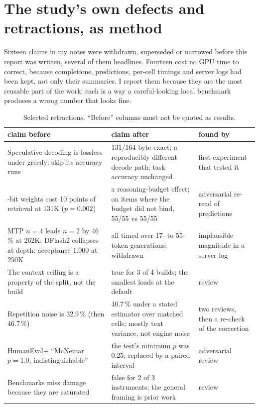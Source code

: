 \section{The study's own defects and retractions, as method}\label{sec:corrections}

Sixteen claims in my notes were withdrawn, superseded or narrowed before this report was written,
several of them headlines. Fourteen cost no GPU time to correct, because completions, predictions,
per-cell timings and server logs had been kept, not only their summaries. I report them because they
are the most reusable part of the work: each is a way a careful-looking local benchmark produces a
wrong number that looks fine.

\begin{table}[t]
\centering\footnotesize
\caption{Selected retractions. ``Before'' columns must not be quoted as results.}\label{tab:retractions}
\begin{tabularx}{\linewidth}{@{}>{\raggedright\arraybackslash}p{4.6cm}X>{\raggedright\arraybackslash}p{2.6cm}@{}}
\toprule
claim before & claim after & found by \\
\midrule
Speculative decoding is lossless under greedy; skip its accuracy runs & 131/164 byte-exact; a reproducibly different decode path; task accuracy unchanged & first experiment that tested it \\
4-bit weights cost 10 points of retrieval at 131K ($p=0.002$) & a reasoning-budget effect; on items where the budget did not bind, 55/55 vs 55/55 & adversarial re-read of predictions \\
MTP $n{=}4$ leads $n{=}2$ by 46\,\% at 262K; DFlash2 collapses at depth; acceptance 1.000 at 250K & all timed over 17- to 55-token generations; withdrawn & implausible magnitude in a server log \\
The context ceiling is a property of the split, not the build & true for 3 of 4 builds; the smallest loads at the default & review \\
Repetition noise is 32.9\,\% (then 46.7\,\%) & 40.7\,\% under a stated estimator over matched cells; mostly text variance, not engine noise & two reviews, then a re-check of the correction \\
HumanEval+ ``McNemar $p=1.0$, indistinguishable'' & the test's minimum $p$ was 0.25; replaced by a paired interval & adversarial review \\
Benchmarks miss damage because they are saturated & false for 2 of 3 instruments; the general framing is prior work \citep{dutta2024accuracy} & review \\

\end{tabularx}
\end{table}
